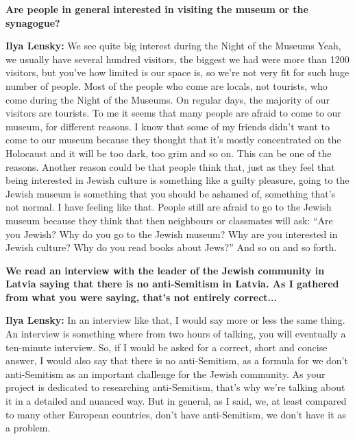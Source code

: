 \textbf{Are people in general interested in visiting the museum or the synagogue?} 

\textbf{Ilya Lensky:} We see quite big interest during the Night of the Museums Yeah, we usually have several hundred visitors, the biggest we had were more than 1200 visitors, but you've how limited is our space is, so we’re not very fit for such huge number of people. Most of the people who come are locals, not tourists, who come during the Night of the Museums. On regular days, the majority of our visitors are tourists. To me it seems that many people are afraid to come to our museum, for different reasons. I know that some of my friends didn't want to come to our museum because they thought that it’s mostly concentrated on the Holocaust and it will be too dark, too grim and so on. This can be one of the reasons. Another reason could be that people think that, just as they feel that being interested in Jewish culture is something like a guilty pleasure, going to the Jewish museum is something that you should be ashamed of, something that's not normal. I have feeling like that. People still are afraid to go to the Jewish museum because they think that then neighbours or classmates will ask: ``Are you Jewish? Why do you go to the Jewish museum? Why are you interested in Jewish culture? Why do you read books about Jews?'' And so on and so forth.

\textbf{We read an interview with the leader of the Jewish community in Latvia saying that there is no anti-Semitism in Latvia. As I gathered from what you were saying, that’s not entirely correct...} 

\textbf{Ilya Lensky:} In an interview like that, I would say more or less the same thing. An interview is something where from two hours of talking, you will eventually a ten-minute interview. So, if I would be asked for a correct, short and concise answer, I would also say that there is no anti-Semitism, as a formula for we don’t anti-Semitism as an important challenge for the Jewish community. As your project is dedicated to researching anti-Semitism, that’s why we’re talking about it in a detailed and nuanced way. But in general, as I said, we, at least compared to many other European countries, don’t have anti-Semitism, we don’t have it as a problem.